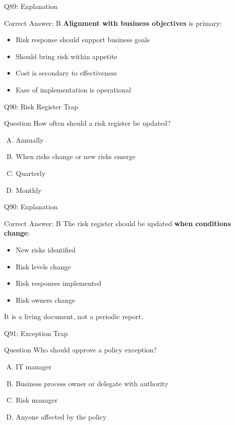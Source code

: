 \documentclass{beamer}
\begin{document}
	\begin{frame}{Q89: Explanation}
		\begin{block}{Correct Answer: B}
			\textbf{Alignment with business objectives} is primary:
			\begin{itemize}
				\item Risk response should support business goals
				\item Should bring risk within appetite
				\item Cost is secondary to effectiveness
				\item Ease of implementation is operational
			\end{itemize}
		\end{block}
	\end{frame}
	
	\begin{frame}{Q90: Risk Register Trap}
		\begin{block}{Question}
			How often should a risk register be updated?
		\end{block}
		\begin{enumerate}[(A)]
			\item Annually
			\item When risks change or new risks emerge
			\item Quarterly
			\item Monthly
		\end{enumerate}
	\end{frame}
	
	\begin{frame}{Q90: Explanation}
		\begin{block}{Correct Answer: B}
			The risk register should be updated \textbf{when conditions change}:
			\begin{itemize}
				\item New risks identified
				\item Risk levels change
				\item Risk responses implemented
				\item Risk owners change
			\end{itemize}
			It is a living document, not a periodic report.
		\end{block}
	\end{frame}
	
	\begin{frame}{Q91: Exception Trap}
		\begin{block}{Question}
			Who should approve a policy exception?
		\end{block}
		\begin{enumerate}[(A)]
			\item IT manager
			\item Business process owner or delegate with authority
			\item Risk manager
			\item Anyone affected by the policy
		\end{enumerate}
	\end{frame}
	
\end{document}
